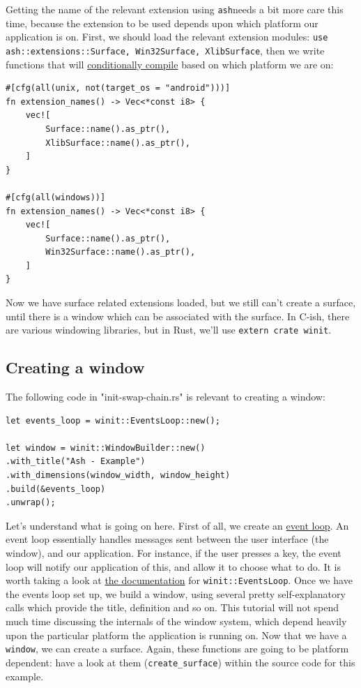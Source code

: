 \documentclass[12pt,letterpaper]{article}
\newcommand{\ril}[1]{\texttt{#1}}
\newcommand{\ash}{\texttt{ash}}
\begin{document}
	Getting the name of the relevant extension using \ash needs a bit more care this time, because the extension to be used depends upon which platform our application is on. First, we should load the relevant extension modules: \ril{use ash::extensions::{Surface, Win32Surface, XlibSurface}}, then we write functions that will \href{https://doc.rust-lang.org/book/first-edition/conditional-compilation.html}{conditionally compile} based on which platform we are on:
\begin{verbatim}
#[cfg(all(unix, not(target_os = "android")))]
fn extension_names() -> Vec<*const i8> {
	vec![
		Surface::name().as_ptr(),
		XlibSurface::name().as_ptr(),
	]
}

#[cfg(all(windows))]
fn extension_names() -> Vec<*const i8> {
	vec![
		Surface::name().as_ptr(),
		Win32Surface::name().as_ptr(),
	]
}
\end{verbatim}

	Now we have surface related extensions loaded, but we still can't create a surface, until there is a window which can be associated with the surface. In C-ish, there are various windowing libraries, but in Rust, we'll use \ril{extern crate winit}. 
	
	\subsection{Creating a window}
		The following code in "init-swap-chain.rs" is relevant to creating a window:
			\begin{verbatim}
let events_loop = winit::EventsLoop::new();

let window = winit::WindowBuilder::new()
.with_title("Ash - Example")
.with_dimensions(window_width, window_height)
.build(&events_loop)
.unwrap();
			\end{verbatim}
			
		Let's understand what is going on here. First of all, we create an \href{https://en.wikipedia.org/wiki/Event_loop#Windows_applications}{event loop}. An event loop essentially handles messages sent between the user interface (the window), and our application. For instance, if the user presses a key, the event loop will notify our application of this, and allow it to choose what to do. It is worth taking a look at \href{https://docs.rs/winit/0.10.0/winit/struct.EventsLoop.html}{the documentation} for \ril{winit::EventsLoop}. Once we have the events loop set up, we build a window, using several pretty self-explanatory calls which provide the title, definition and so on. This tutorial will not spend much time discussing the internals of the window system, which depend heavily upon the particular platform the application is running on. Now that we have a \ril{window}, we can create a surface. Again, these functions are going to be platform dependent: have a look at them (\ril{create_surface}) within the source code for this example. 
        
\end{document}
